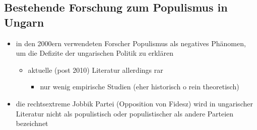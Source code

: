 \documentclass[11pt]{article}
\begin{document}
\subsection{Bestehende Forschung zum Populismus in Ungarn}
\label{sec:orgbf1252e}
\begin{itemize}
\item in den 2000ern verwendeten Forscher Populismus als negatives Phänomen, um die Defizite der ungarischen Politik zu erklären
\begin{itemize}
\item aktuelle (post 2010) Literatur allerdings rar
\begin{itemize}
\item nur wenig empirische Studien (eher historisch o rein theoretisch)
\end{itemize}
\end{itemize}
\item die rechtsextreme Jobbik Partei (Opposition von Fidesz) wird in ungarischer Literatur nicht als populistisch oder populistischer als andere Parteien bezeichnet


\end{itemize}
\end{document}
